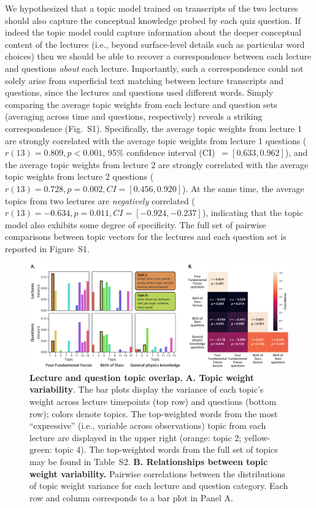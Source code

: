 \documentclass[10pt]{article}
\newcommand{\topics}{S2}
\newcommand{\topicWeights}{S1}
\begin{document}
We hypothesized that a topic model trained on transcripts of the two lectures
should also capture the conceptual knowledge probed by each quiz question. If
indeed the topic model could capture information about the deeper conceptual
content of the lectures (i.e., beyond surface-level details such as particular
word choices) then we should be able to recover a correspondence between each
lecture and questions \textit{about} each lecture. Importantly, such a
correspondence could not solely arise from superficial text matching between
lecture transcripts and questions, since the lectures and questions used
different words. Simply comparing the average topic weights from each lecture
and question sets (averaging across time and questions, respectively) reveals a
striking correspondence (Fig.~\topicWeights). Specifically, the average topic
weights from lecture 1 are strongly correlated with the average topic weights
from lecture 1 questions ($r(13) = 0.809, p < 0.001$, 95\% confidence interval
(CI)~$= [0.633, 0.962]$), and the average topic weights from lecture 2 are
strongly correlated with the average topic weights from lecture 2 questions
($r(13) = 0.728, p = 0.002, CI = [0.456, 0.920]$). At the same time, the
average topics from two lectures are \textit{negatively} correlated ($r(13) =
-0.634, p = 0.011, CI = [-0.924, -0.237]$), indicating that the topic model
also exhibits some degree of specificity. The full set of pairwise comparisons
between topic vectors for the lectures and each question set is reported in
Figure~\topicWeights.

\begin{figure}[tp]
    \centering
    \includegraphics[width=\textwidth]{figs/active-topics}

\caption{\textbf{Lecture and question topic overlap.} \textbf{A. Topic weight
variability}. The bar plots display the variance of each topic's weight across
lecture timepoints (top row) and questions (bottom row); colors denote topics.
The top-weighted words from the most ``expressive'' (i.e., variable across
observations) topic from each lecture are displayed in the upper right (orange:
topic 2; yellow-green: topic 4). The top-weighted words from the full set of
topics may be found in Table~\topics. \textbf{B. Relationships between topic
weight variability.} Pairwise correlations between the distributions of topic
weight variance for each lecture and question category. Each row and column
corresponds to a bar plot in Panel A.}

    \label{fig:topics}
\end{figure}
\end{document}
